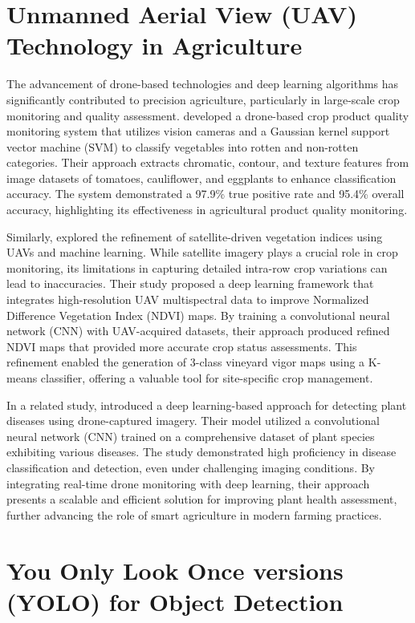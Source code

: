\section{Unmanned Aerial View (UAV) Technology in Agriculture}
The advancement of drone-based technologies and deep learning algorithms has significantly contributed to precision agriculture, particularly in large-scale crop monitoring and quality assessment. \cite{Alam2022} developed a drone-based crop product quality monitoring system that utilizes vision cameras and a Gaussian kernel support vector machine (SVM) to classify vegetables into rotten and non-rotten categories. Their approach extracts chromatic, contour, and texture features from image datasets of tomatoes, cauliflower, and eggplants to enhance classification accuracy. The system demonstrated a 97.9\% true positive rate and 95.4\% overall accuracy, highlighting its effectiveness in agricultural product quality monitoring.

Similarly, \cite{Mazzia2020} explored the refinement of satellite-driven vegetation indices using UAVs and machine learning. While satellite imagery plays a crucial role in crop monitoring, its limitations in capturing detailed intra-row crop variations can lead to inaccuracies. Their study proposed a deep learning framework that integrates high-resolution UAV multispectral data to improve Normalized Difference Vegetation Index (NDVI) maps. By training a convolutional neural network (CNN) with UAV-acquired datasets, their approach produced refined NDVI maps that provided more accurate crop status assessments. This refinement enabled the generation of 3-class vineyard vigor maps using a K-means classifier, offering a valuable tool for site-specific crop management.

In a related study, \cite{Vardhan2023} introduced a deep learning-based approach for detecting plant diseases using drone-captured imagery. Their model utilized a convolutional neural network (CNN) trained on a comprehensive dataset of plant species exhibiting various diseases. The study demonstrated high proficiency in disease classification and detection, even under challenging imaging conditions. By integrating real-time drone monitoring with deep learning, their approach presents a scalable and efficient solution for improving plant health assessment, further advancing the role of smart agriculture in modern farming practices.

\section{You Only Look Once versions (YOLO) for Object Detection}

